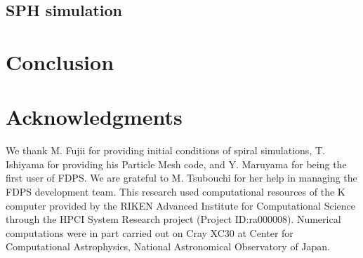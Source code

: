 \documentclass{acm_proc_article-sp}
\begin{document}


\subsection{SPH simulation}
\label{sec:sph}



\section{Conclusion}
\label{sec:conclusion}




\section{Acknowledgments}

We thank M. Fujii for providing initial conditions of spiral
simulations, T. Ishiyama for providing his Particle Mesh code, and
Y. Maruyama for being the first user of FDPS.  We are grateful to
M. Tsubouchi for her help in managing the FDPS development team. This
research used computational resources of the K computer provided by
the RIKEN Advanced Institute for Computational Science through the
HPCI System Research project (Project ID:ra000008). Numerical
computations were in part carried out on Cray XC30 at Center for
Computational Astrophysics, National Astronomical Observatory of
Japan.



\end{document}
